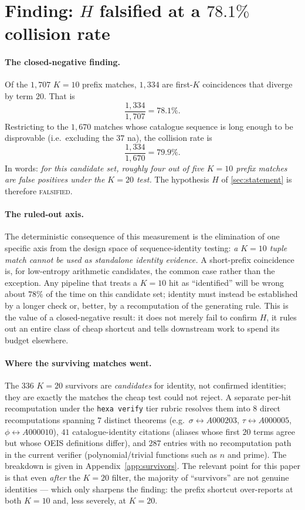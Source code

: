 \documentclass[11pt,a4paper]{article}
\newcommand{\sig}{\sigma}
\newcommand{\Kten}{K\!=\!10}
\newcommand{\Ktwenty}{K\!=\!20}
\theoremstyle{definition}
\begin{document}
\section{Finding: $H$ falsified at a $78.1\%$ collision rate}
\label{sec:finding}

\paragraph{The closed-negative finding.} Of the $1{,}707$ $\Kten$ prefix
matches, $1{,}334$ are first-$K$ coincidences that diverge by term $20$. That is
\[
  \frac{1{,}334}{1{,}707} = 78.1\% .
\]
Restricting to the $1{,}670$ matches whose catalogue sequence is long enough to
be disprovable (i.e.\ excluding the $37$ na), the collision rate is
\[
  \frac{1{,}334}{1{,}670} = 79.9\% .
\]
In words: \emph{for this candidate set, roughly four out of five $\Kten$ prefix
matches are false positives under the $\Ktwenty$ test.} The hypothesis $H$ of
\textsection\ref{sec:statement} is therefore \textsc{falsified}.

\paragraph{The ruled-out axis.} The deterministic consequence of this
measurement is the elimination of one specific axis from the design space of
sequence-identity testing: \emph{a $\Kten$ tuple match cannot be used as
standalone identity evidence.} A short-prefix coincidence is, for low-entropy
arithmetic candidates, the common case rather than the exception. Any pipeline
that treats a $\Kten$ hit as ``identified'' will be wrong about $78\%$ of the
time on this candidate set; identity must instead be established by a longer
check or, better, by a recomputation of the generating rule. This is the value
of a closed-negative result: it does not merely fail to confirm $H$, it
rules out an entire class of cheap shortcut and tells downstream work to spend
its budget elsewhere.

\paragraph{Where the surviving matches went.} The $336$ $\Ktwenty$ survivors
are \emph{candidates} for identity, not confirmed identities; they are exactly
the matches the cheap test could not reject. A separate per-hit recomputation
under the \texttt{hexa verify} tier rubric resolves them into $8$ direct
recomputations spanning $7$ distinct theorems (e.g.\ $\sig\!\leftrightarrow\!
A000203$, $\tau\!\leftrightarrow\!A000005$, $\phi\!\leftrightarrow\!A000010$),
$41$ catalogue-identity citations (aliases whose first $20$ terms agree but
whose OEIS definitions differ), and $287$ entries with no recomputation path in
the current verifier (polynomial/trivial functions such as $n$ and prime). The
breakdown is given in Appendix~\ref{app:survivors}. The relevant point for this
paper is that even \emph{after} the $\Ktwenty$ filter, the majority of
``survivors'' are not genuine identities --- which only sharpens the finding:
the prefix shortcut over-reports at both $K=10$ and, less severely, at $K=20$.
\end{document}
